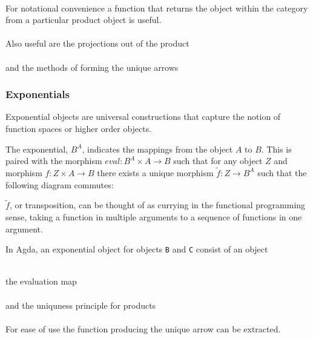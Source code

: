 \begin{AgdaMultiCode}
\\
For notational convenience a function that returns the object within the
category from a particular product object is useful.\\
\\
Also useful are the projections out of the product \\
 \\
and the methods of forming the unique arrows \\
\end{AgdaMultiCode}


\subsubsection{Exponentials}

Exponential objects are universal constructions that capture the notion of
function spaces or higher order objects.

The exponential, $B^{A}$, indicates the mappings from the object $A$ to $B$. This is
paired with the morphism $eval: B^{A} \times A \rightarrow B$ such that for any
object $Z$ and morphism $f : Z\times A \rightarrow B$ there exists a unique
morphism $\tilde{f}: Z \rightarrow B^{A}$ such that the following diagram
commutes:


$\tilde{f}$, or transposition, can be thought of as currying in the functional
programming sense, taking a function in multiple arguments to a sequence of
functions in one argument.

In Agda, an exponential object for objects \verb|B| and \verb|C| consist of an
object

\begin{AgdaMultiCode}
\\
the evaluation map
\\
\\
and the uniquness principle for products
\\
\\
For ease of use the function producing the unique arrow can be extracted.\\
\end{AgdaMultiCode}

